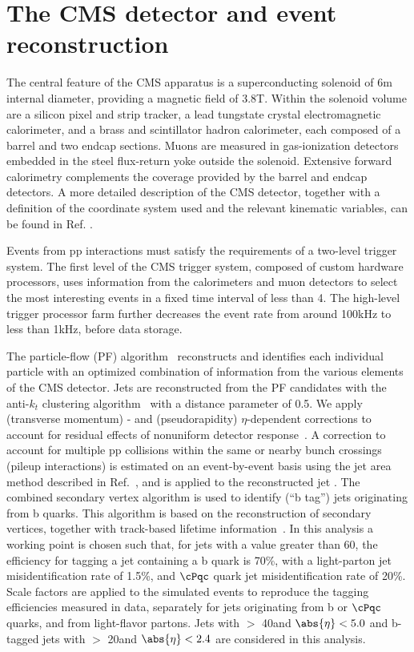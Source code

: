 \section{The CMS detector and event reconstruction}
\label{sect:CMSRec}
The central feature of the CMS apparatus is a superconducting solenoid of 6\unit{m} internal diameter, providing a magnetic field of 3.8\unit{T}. Within the solenoid volume are a silicon pixel and strip tracker, a lead tungstate crystal electromagnetic calorimeter, and a brass and scintillator hadron calorimeter, each composed of a barrel and two endcap sections. Muons are measured in gas-ionization detectors embedded in the steel flux-return yoke outside the solenoid. Extensive forward calorimetry complements the coverage provided by the barrel and endcap detectors. 
A more detailed description of the CMS detector, together with a definition of the coordinate system used and the relevant kinematic variables, can be found in Ref. \cite{Chatrchyan:2008zzk}.

Events from pp interactions must satisfy the requirements of a two-level trigger system.
The first level of the CMS trigger system, composed of custom hardware processors, uses information from the calorimeters and muon detectors to select the most interesting events in a fixed time interval of less than 4\mus. The high-level trigger processor farm further decreases the event rate from around 100\unit{kHz} to less than 1\unit{kHz}, before data storage. 

The particle-flow (PF) algorithm~\cite{CMS-PAS-PFT-09-001,CMS-PAS-PFT-10-001} reconstructs and identifies each individual particle with an optimized combination of information from the various elements of the CMS detector. 
Jets are reconstructed from the PF candidates with the anti-$k_t$ clustering
algorithm~\cite{Cacciari:2008gp} with a distance parameter of 0.5. We apply
 (transverse momentum) \pt- and (pseudorapidity) $\eta$-dependent corrections to account for residual
effects of nonuniform detector response~\cite{Chatrchyan:2011ds}.
A correction to account for multiple pp collisions within the same or nearby
bunch crossings (pileup interactions) is estimated on an event-by-event basis using the
jet area method described in Ref.~\cite{Cacciari:2007fd}, and is
applied to the reconstructed jet \pt.
The combined secondary vertex algorithm is used to identify (``b tag'') jets 
originating from b quarks.  This algorithm 
 is based on the reconstruction of secondary vertices, together with track-based lifetime information~\cite{Chatrchyan:2012jua}. 
In this analysis a working point is chosen such that, for jets with a \PT value greater than 60\GeV, the efficiency for tagging a jet containing a b quark is 70\%, with a light-parton jet misidentification rate of 1.5\%, and $\cPqc$ quark jet misidentification rate of 20\%.
Scale factors are applied to the simulated events to reproduce the tagging efficiencies measured in data, 
separately for jets originating from b or $\cPqc$ quarks, and from light-flavor partons.
Jets with  \PT $>$ 40\GeV and $\abs{\eta} < 5.0$ and b-tagged jets with \PT $>$ 20\GeV and $\abs{\eta} < 2.4$ are considered in this analysis.



